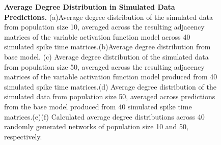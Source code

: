 \documentclass[11pt,titlepage]{article}
\begin{document}
\begin{figure}[H]
\caption[Average Degree Distribution in Simulated Data Predictions]{\textbf{Average Degree Distribution in Simulated Data Predictions.} (a)Average degree distribution of the simulated data from population size 10, averaged across the resulting adjacency matrices of the variable activation function model across 40 simulated spike time matrices.(b)Average degree distribution from base model. (c) Average degree distribution of the simulated data from population size 50, averaged across the resulting adjacency matrices of the variable activation function model produced from 40 simulated spike time matrices.(d) Average degree distribution of the simulated data from population size 50, averaged across predictions from the base model produced from 40 simulated spike time matrices.(e)(f) Calculated average degree distributions across 40 randomly generated networks of population size 10 and 50, respectively.}
\label{fig:DD}
\end{figure}
\end{document}
